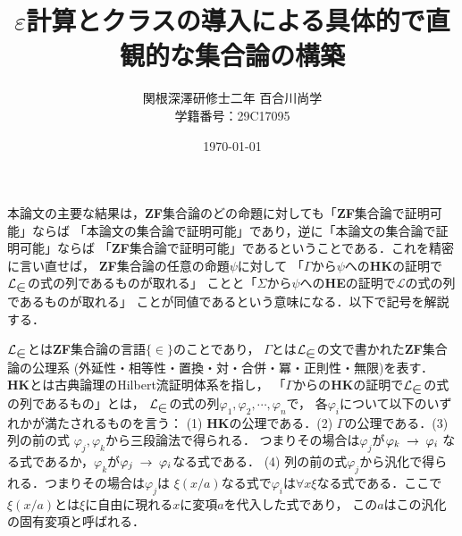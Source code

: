 \documentclass[twocolumn,10pt]{jarticle}
\title{$\varepsilon$計算とクラスの導入による具体的で直観的な集合論の構築}
\author{関根深澤研修士二年 百合川尚学 \\ 学籍番号：29C17095}
\date{\today}
\theoremstyle{mystyle}
\newcommand{\lang}[1]{\mathcal{L}_{\scalebox{1.2}{$#1$}}} %
\newcommand{\rarrow}{\hspace{0.25em}\rightarrow\hspace{0.25em}} %
\begin{document}
\maketitle
	本論文の主要な結果は，{\bf ZF}集合論のどの命題に対しても「{\bf ZF}集合論で証明可能」ならば
	「本論文の集合論で証明可能」であり，逆に「本論文の集合論で証明可能」ならば
	「{\bf ZF}集合論で証明可能」であるということである．これを精密に言い直せば，
	{\bf ZF}集合論の任意の命題$\psi$に対して
	「$\Gamma$から$\psi$への{\bf HK}の証明で$\lang{\in}$の式の列であるものが取れる」
	ことと「$\Sigma$から$\psi$への{\bf HE}の証明で$\mathcal{L}$の式の列であるものが取れる」
	ことが同値であるという意味になる．以下で記号を解説する．
	
	$\lang{\in}$とは{\bf ZF}集合論の言語$\{\in\}$のことであり，
	$\Gamma$とは$\lang{\in}$の文で書かれた{\bf ZF}集合論の公理系
	(外延性・相等性・置換・対・合併・冪・正則性・無限)を表す．
	{\bf HK}とは古典論理のHilbert流証明体系を指し，
	「$\Gamma$からの{\bf HK}の証明で$\lang{\in}$の式の列であるもの」とは，
	$\lang{\in}$の式の列$\varphi_{1},\varphi_{2},\cdots,\varphi_{n}$で，
	各$\varphi_{i}$について以下のいずれかが満たされるものを言う：
	(1) {\bf HK}の公理である．(2) $\Gamma$の公理である．(3) 列の前の式
	$\varphi_{j},\varphi_{k}$から三段論法で得られる．
	つまりその場合は$\varphi_{j}$が$\varphi_{k} \rarrow \varphi_{i}$
	なる式であるか，$\varphi_{k}$が$\varphi_{j} \rarrow \varphi_{i}$なる式である．
	(4) 列の前の式$\varphi_{j}$から汎化で得られる．つまりその場合は$\varphi_{j}$は
	$\xi(x/a)$なる式で$\varphi_{i}$は$\forall x \xi$なる式である．ここで
	$\xi(x/a)$とは$\xi$に自由に現れる$x$に変項$a$を代入した式であり，
	この$a$はこの汎化の固有変項と呼ばれる．
	
\end{document}
